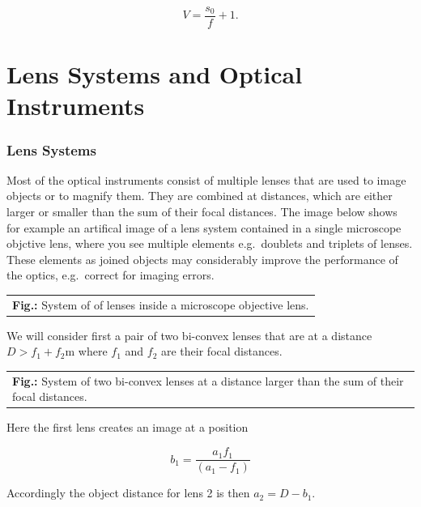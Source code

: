 \documentclass[
  a4paper,
]{book}
\begin{document}
\[
V=\frac{s_0}{f}+1.
\]

\chapter{Lens Systems and Optical
Instruments}\label{lens-systems-and-optical-instruments}

\subsection{Lens Systems}\label{lens-systems}

Most of the optical instruments consist of multiple lenses that are used
to image objects or to magnify them. They are combined at distances,
which are either larger or smaller than the sum of their focal
distances. The image below shows for example an artifical image of a
lens system contained in a single microscope objctive lens, where you
see multiple elements e.g.~doublets and triplets of lenses. These
elements as joined objects may considerably improve the performance of
the optics, e.g.~correct for imaging errors.

\begin{longtable}[]{@{}l@{}}
\toprule\noalign{}
 \\
\midrule\noalign{}
\endhead
\bottomrule\noalign{}
\endlastfoot
\textbf{Fig.:} System of of lenses inside a microscope objective
lens. \\
\end{longtable}

We will consider first a pair of two bi-convex lenses that are at a
distance \(D>f_1+f_2\)m where \(f_1\) and \(f_2\) are their focal
distances.

\begin{longtable}[]{@{}
  >{\raggedright\arraybackslash}p{}@{}}
\toprule\noalign{}
\begin{minipage}[b]{\linewidth}\raggedright
\end{minipage} \\
\midrule\noalign{}
\endhead
\bottomrule\noalign{}
\endlastfoot
\textbf{Fig.:} System of two bi-convex lenses at a distance larger than
the sum of their focal distances. \\
\end{longtable}

Here the first lens creates an image at a position

\[b_1=\frac{a_1 f_1}{(a_1-f_1)}\]

Accordingly the object distance for lens 2 is then \(a_2=D-b_1\).
\end{document}

